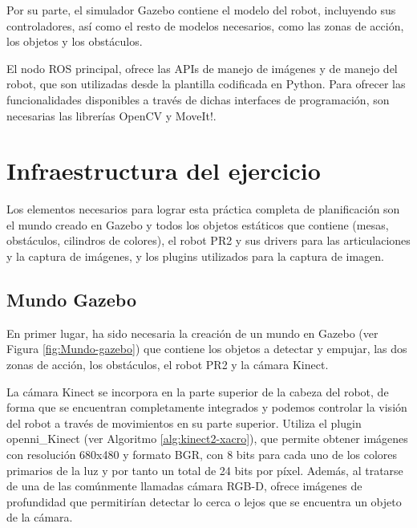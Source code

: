 \documentclass[12pt,spanish,chapterprefix, numbers=noenddot]{book}
\numberwithin{equation}{section}
\numberwithin{figure}{section}
\begin{document}
Por su parte, el simulador Gazebo contiene el modelo del robot, incluyendo sus controladores, así como el resto de modelos necesarios, como las zonas de acción, los objetos y los obstáculos.  

El nodo ROS principal, ofrece las APIs de manejo de imágenes y de manejo del robot, que son utilizadas desde la plantilla codificada en Python. Para ofrecer las funcionalidades disponibles a través de dichas interfaces de programación, son necesarias las librerías OpenCV y MoveIt!.

\section{Infraestructura del ejercicio}\label{sec:infraestructura}
Los elementos necesarios para lograr esta práctica completa de planificación son el mundo creado en Gazebo y todos los objetos estáticos que contiene (mesas, obstáculos, cilindros de colores), el robot PR2 y sus drivers para las articulaciones y la captura de imágenes, y los plugins utilizados para la captura de imagen.  

\subsection{Mundo Gazebo}
En primer lugar, ha sido necesaria la creación de un mundo en Gazebo (ver Figura \ref{fig:Mundo-gazebo}) que contiene los objetos a detectar y empujar, las dos zonas de acción, los obstáculos, el robot PR2 y la cámara Kinect.

La cámara Kinect se incorpora en la parte superior de la cabeza del robot, de forma que se encuentran completamente integrados y podemos controlar la visión del robot a través de movimientos en su parte superior.
Utiliza el plugin openni\_Kinect (ver Algoritmo \ref{alg:kinect2-xacro}), que permite obtener imágenes con resolución 680x480 y formato BGR, con 8 bits para cada uno de los colores primarios de la luz y por tanto un total de 24 bits por píxel. Además, al tratarse de una de las comúnmente llamadas cámara RGB-D, ofrece imágenes de profundidad que permitirían detectar lo cerca o lejos que se encuentra un objeto de la cámara. 
\end{document}
